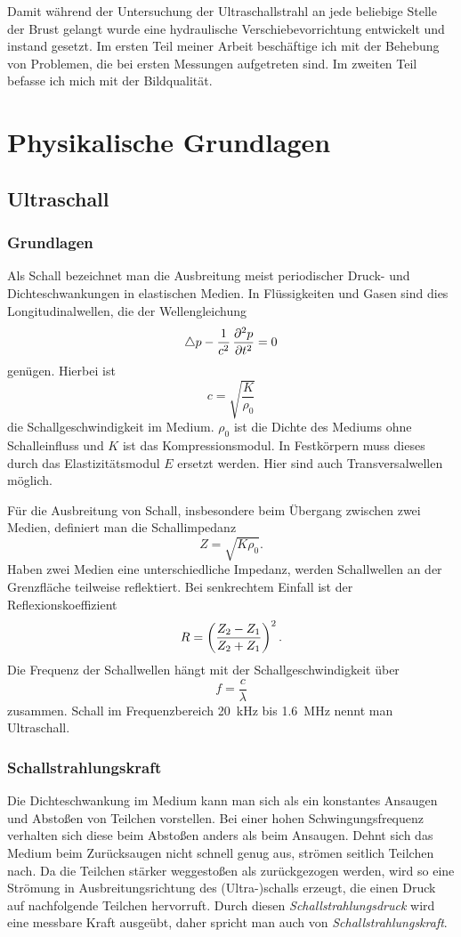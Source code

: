 \documentclass[
    11pt,
    ngerman
]{scrbook}
\begin{document}
Damit während der Untersuchung der Ultraschallstrahl an jede beliebige Stelle
der Brust gelangt wurde eine hydraulische Verschiebevorrichtung entwickelt und
instand gesetzt. Im ersten Teil meiner Arbeit beschäftige ich mit der Behebung
von Problemen, die bei ersten Messungen aufgetreten sind. Im zweiten Teil
befasse ich mich mit der Bildqualität.

\chapter{Physikalische Grundlagen}

\section{Ultraschall}

\subsection{Grundlagen}

Als Schall bezeichnet man die Ausbreitung meist periodischer Druck- und
Dichteschwankungen in elastischen Medien. In Flüssigkeiten und Gasen sind dies
Longitudinalwellen, die der Wellengleichung
\[
    \laplace p - \frac1{c^2}\dpd[2]pt = 0
\]
genügen. Hierbei ist
\[
    c=\sqrt{\frac{K}{\rho_0}}
\]
die Schallgeschwindigkeit im Medium. $\rho_0$ ist die Dichte des Mediums ohne
Schalleinfluss und $K$ ist das Kompressionsmodul. In Festkörpern muss dieses
durch das Elastizitätsmodul $E$ ersetzt werden. Hier sind auch
Transversalwellen möglich.

Für die Ausbreitung von Schall, insbesondere beim Übergang zwischen zwei
Medien, definiert man die Schallimpedanz
\[
    Z=\sqrt{K\rho_0}.
\]
Haben zwei Medien eine unterschiedliche Impedanz, werden Schallwellen an der
Grenzfläche teilweise reflektiert. Bei senkrechtem Einfall ist der
Reflexionskoeffizient
\[
    R=\del{\frac{Z_2-Z_1}{Z_2+Z_1}}^2.
\]
Die Frequenz der Schallwellen hängt mit der Schallgeschwindigkeit über
\[
    f = \frac c\lambda
\]
zusammen. Schall im Frequenzbereich \SI{20}{\kilo\hertz} bis
\SI{1.6}{\mega\hertz} nennt man Ultraschall.

\subsection{Schallstrahlungskraft}

Die Dichteschwankung im Medium kann man sich als ein konstantes Ansaugen und
Abstoßen von Teilchen vorstellen. Bei einer hohen Schwingungsfrequenz verhalten
sich diese beim Abstoßen anders als beim Ansaugen. Dehnt sich das Medium beim
Zurücksaugen nicht schnell genug aus, strömen seitlich Teilchen nach. Da die
Teilchen stärker weggestoßen als zurückgezogen werden, wird so eine Strömung in
Ausbreitungsrichtung des (Ultra-)schalls erzeugt, die einen Druck auf
nachfolgende Teilchen hervorruft. Durch diesen \emph{Schallstrahlungsdruck}
wird eine messbare Kraft ausgeübt, daher spricht man auch von
\emph{Schallstrahlungskraft}. 
\end{document}
